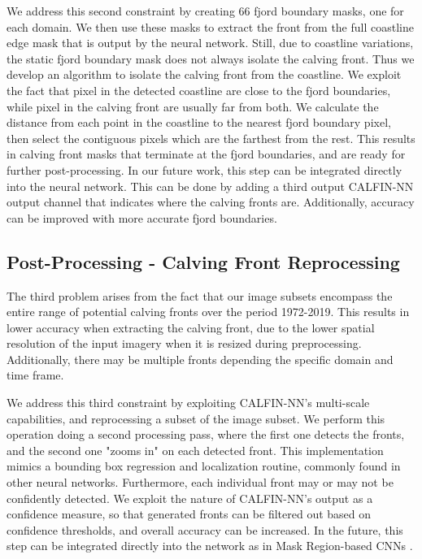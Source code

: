 \documentclass[tc, manuscript]{copernicus}
\begin{document}
We address this second constraint by creating 66 fjord boundary masks, one for each domain. We then use these masks to extract the front from the full coastline edge mask that is output by the neural network. Still, due to coastline variations, the static fjord boundary mask does not always isolate the calving front. Thus we develop an algorithm to isolate the calving front from the coastline. We exploit the fact that pixel in the detected coastline are close to the fjord boundaries, while pixel in the calving front are usually far from both. We calculate the distance from each point in the coastline to the nearest fjord boundary pixel, then select the contiguous pixels which are the farthest from the rest. This results in calving front masks that terminate at the fjord boundaries, and are ready for further post-processing. In our future work, this step can be integrated directly into the neural network. This can be done by adding a third output CALFIN-NN output channel that indicates where the calving fronts are. Additionally, accuracy can be improved with more accurate fjord boundaries.


\subsection{Post-Processing - Calving Front Reprocessing}
The third problem arises from the fact that our image subsets encompass the entire range of potential calving fronts over the period 1972-2019. This results in lower accuracy when extracting the calving front, due to the lower spatial resolution of the input imagery when it is resized during preprocessing. Additionally, there may be multiple fronts depending the specific domain and time frame. %

We address this third constraint by exploiting CALFIN-NN's multi-scale capabilities, and reprocessing a subset of the image subset. We perform this operation doing a second processing pass, where the first one detects the fronts, and the second one "zooms in" on each detected front. This implementation mimics a bounding box regression and localization routine, commonly found in other neural networks. Furthermore, each individual front may or may not be confidently detected. We exploit the nature of CALFIN-NN's output as a confidence measure, so that generated fronts can be filtered out based on confidence thresholds, and overall accuracy can be increased. In the future, this step can be integrated directly into the network as in Mask Region-based CNNs \citep{he2017}.
\end{document}
